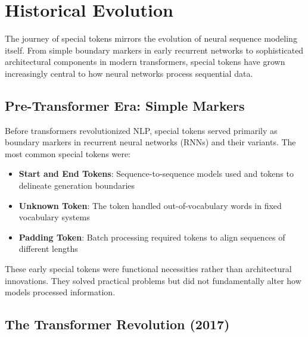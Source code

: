 \section{Historical Evolution}

The journey of special tokens mirrors the evolution of neural sequence modeling itself. From simple boundary markers in early recurrent networks to sophisticated architectural components in modern transformers, special tokens have grown increasingly central to how neural networks process sequential data.

\subsection{Pre-Transformer Era: Simple Markers}

Before transformers revolutionized NLP, special tokens served primarily as boundary markers in recurrent neural networks (RNNs) and their variants. The most common special tokens were:

\begin{itemize}
\item \textbf{Start and End Tokens}: Sequence-to-sequence models used  and  tokens to delineate generation boundaries
\item \textbf{Unknown Token}: The  token handled out-of-vocabulary words in fixed vocabulary systems
\item \textbf{Padding Token}: Batch processing required  tokens to align sequences of different lengths
\end{itemize}

These early special tokens were functional necessities rather than architectural innovations. They solved practical problems but did not fundamentally alter how models processed information.

\subsection{The Transformer Revolution (2017)}

